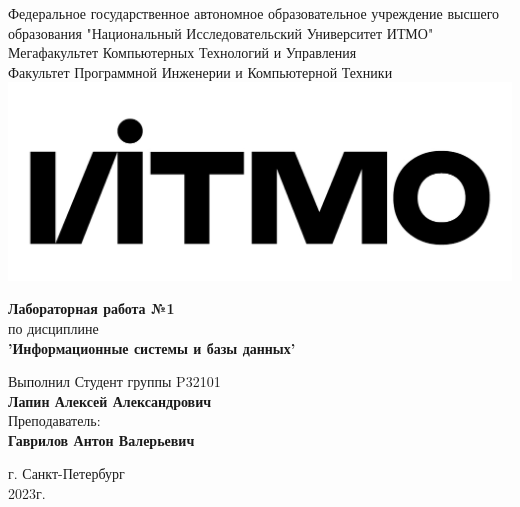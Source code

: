 \documentclass[12pt,onecolumn]{article}
\begin{document}
\setcounter{tocdepth}{4}
\begin{center}
    Федеральное государственное автономное образовательное учреждение высшего образования "Национальный Исследовательский Университет ИТМО"\\ 
    Мегафакультет Компьютерных Технологий и Управления\\
    Факультет Программной Инженерии и Компьютерной Техники \\
    \includegraphics[scale=0.3]{image/itmo.jpg} %
\end{center}
\vspace{1cm}


\begin{center}
    \textbf{Лабораторная работа №1}\\
    по дисциплине\\
    \textbf{'Информационные системы и базы данных'}
\end{center}

\vspace{2cm}

\begin{flushright}
  Выполнил Студент  группы P32101\\
  \textbf{Лапин Алексей Александрович}\\
  Преподаватель: \\
  \textbf{Гаврилов Антон Валерьевич}\\
\end{flushright}

\vspace{6cm}
\begin{center}
    г. Санкт-Петербург\\
    2023г.
\end{center}

\newpage
\tableofcontents
\newpage
\end{document}
